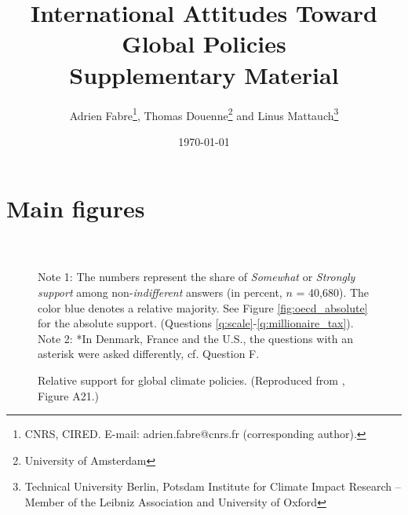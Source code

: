 \documentclass[12pt,english]{article}
\title{International Attitudes Toward Global Policies \\ Supplementary Material %
}
\author{Adrien Fabre\footnote{CNRS, CIRED. E-mail: adrien.fabre@cnrs.fr (corresponding author).}, Thomas Douenne\footnote{University of Amsterdam}\; and Linus Mattauch\footnote{Technical University Berlin, Potsdam Institute for Climate Impact Research -- Member of the Leibniz Association and University of Oxford}}%
\date{\today} %
\begin{document}
\maketitle

\begin{center}
\end{center}





\tableofcontents

\onehalfspacing %

\clearpage
\section*{Main figures}\label{sec:figures}

\begin{figure}[h!]
  \caption[Relative support for global climate policies]{Relative support for global climate policies. (Reproduced from \cite{dechezlepretre_fighting_2022}, Figure A21.)}  %
  \label{fig:oecd} %
  {\footnotesize \\ $\quad$ \\ Note 1: The numbers represent the share of \textit{Somewhat} or \textit{Strongly support} among non-\textit{indifferent} answers (in percent, $n$ = 40,680). The color blue denotes a relative majority. See Figure \ref{fig:oecd_absolute} for the absolute support. (Questions \ref{q:scale}-\ref{q:millionaire_tax}). %
  \\ Note 2: *In Denmark, France and the U.S., the questions with an asterisk were asked differently, cf. Question F.%
  } 
\end{figure}
\end{document}

